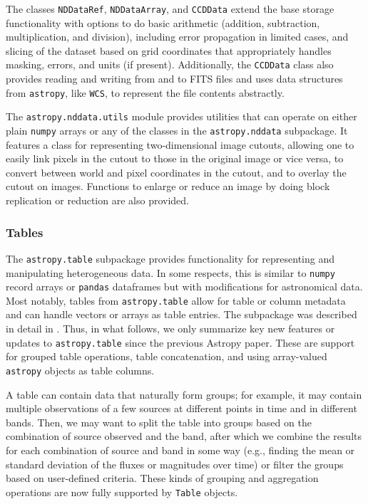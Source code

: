 \documentclass[modern]{aastex62}
\newcommand{\package}[1]{\texttt{#1}\xspace}
\newcommand{\astropy}{Astropy\xspace}
\newcommand{\astropypkg}{\package{astropy}}
\begin{document}
The classes \texttt{NDDataRef}, \texttt{NDDataArray}, and \texttt{CCDData}
extend the base storage functionality with options to do basic arithmetic
(addition, subtraction, multiplication, and division), including error
propagation in limited cases, and slicing of the dataset based on grid
coordinates that appropriately handles masking, errors, and units (if present).
Additionally, the \texttt{CCDData} class also provides reading and writing from
and to FITS files and uses data structures from \astropypkg, like \texttt{WCS},
to represent the file contents abstractly.

The \package{astropy.nddata.utils} module provides utilities that can operate
on either plain \package{numpy} arrays or any of the classes in the
\package{astropy.nddata} subpackage. It features a class for representing
two-dimensional image cutouts, allowing one to easily link pixels in the cutout
to those in the original image or vice versa, to convert
between world and pixel coordinates in the cutout, and to overlay the cutout
on images. Functions to enlarge or reduce an image by doing block replication
or reduction are also provided.

\subsubsection{Tables}
\label{sec:table}

The \package{astropy.table} subpackage provides functionality for
representing and manipulating heterogeneous data. In some respects,
this is similar to \package{numpy} record arrays \citep{numpy} or
\package{pandas} dataframes \citep{pandas} but with modifications for
astronomical data. Most notably, tables from \package{astropy.table}
allow for table or column metadata and can handle
vectors or arrays as table entries.
The subpackage was described in
detail in \cite{astropy}.  Thus, in what follows, we only summarize
key new features or updates to \package{astropy.table} since the
previous \astropy paper. These are support for grouped table
operations, table concatenation, and using array-valued
\package{astropy} objects as table columns.


A table can contain data that naturally form groups; for example, it may
contain multiple observations of a few sources at different points in time
and in different bands. Then, we may want to split the table into groups based
on the combination of source observed and the band, after which we combine the
results for each combination of source and band in some way (e.g., finding
the mean or standard deviation of the fluxes or magnitudes over time) or filter
the groups based on user-defined criteria. These kinds of grouping and
aggregation operations are now fully supported by \texttt{Table} objects.
\end{document}
